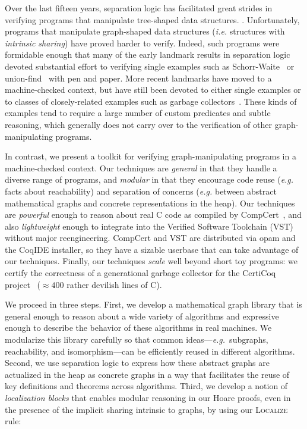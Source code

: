 Over the last fifteen years, separation logic has facilitated great strides
in verifying programs that manipulate tree-shaped data structures.
\citep{berdine:smallfoot,chin:hipsleek,jacobs:verifast,
chlipala:bedrock,bengtson:charge,appel:programlogics}.
Unfortunately, programs that manipulate graph-shaped data structures
(\emph{i.e.} structures with \emph{intrinsic sharing}) have proved harder to verify.
Indeed, such programs were formidable enough that many of the early
landmark results in separation logic devoted substantial effort to verifying
single examples such as Schorr-Waite~\cite{hongseok:phd} or
union-find~\cite{neelthesis} with pen and paper.
More recent landmarks have moved to a machine-checked context, but have still
been devoted to either single examples or to classes of closely-related examples
such as garbage collectors~\cite{gcexample3,cakemlgc}.
These kinds of examples tend to require a large number
of custom predicates and subtle reasoning, which generally
does not carry over
to the verification of other graph-manipulating programs.

In contrast, we present a toolkit for verifying graph-manipulating programs in a
machine-checked context. Our techniques are \emph{general} in that they handle a diverse
range of programs, and \emph{modular} in that they encourage code
reuse (\emph{e.g.} facts about reachability) and separation of concerns
(\emph{e.g.} between abstract mathematical graphs and concrete representations
in the heap).
Our techniques are \emph{powerful} enough to reason about real C code as compiled by
CompCert~\cite{leroy:compcert}, and also
\emph{lightweight} enough to integrate into the Verified
Software Toolchain (VST)~\cite{appel:programlogics} without major reengineering.
CompCert and VST are distributed via opam and the CoqIDE installer, so they have a sizable userbase that can take advantage of our techniques. %
Finally, our techniques \emph{scale} well beyond short toy programs: we certify the
correctness of a generational garbage collector for the CertiCoq
project~\cite{certicoqpaper} ($\approx400$ rather devilish lines of C).

We proceed in three steps. First, we develop a mathematical graph library that is general enough to reason about a wide variety of algorithms and expressive enough to describe the behavior of these algorithms in real machines.  We modularize this library carefully so that common ideas---\emph{e.g.}~subgraphs, reachability, and isomorphism---can be efficiently reused
in different algorithms.  Second, we use separation logic to express how these abstract graphs
are actualized in the heap as concrete graphs in a way that facilitates the reuse of key definitions and theorems across algorithms.  Third, we develop a notion of \emph{localization blocks} that
enables modular reasoning in our Hoare proofs, even in the presence of the
implicit sharing intrinsic to graphs, by using our \textsc{Localize} rule:

